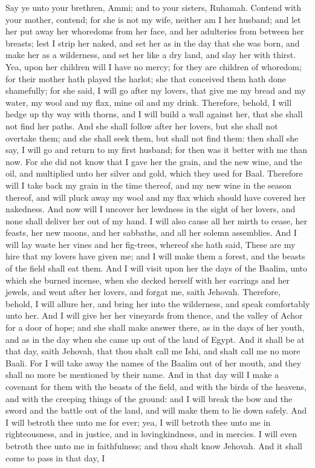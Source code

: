 Say ye unto your brethren, Ammi; and to your sisters, Ruhamah.  Contend with your mother, contend; for she is not my wife, neither am I her husband; and let her put away her whoredoms from her face, and her adulteries from between her breasts; lest I strip her naked, and set her as in the day that she was born, and make her as a wilderness, and set her like a dry land, and slay her with thirst. Yea, upon her children will I have no mercy; for they are children of whoredom; for their mother hath played the harlot; she that conceived them hath done shamefully; for she said, I will go after my lovers, that give me my bread and my water, my wool and my flax, mine oil and my drink. Therefore, behold, I will hedge up thy way with thorns, and I will build a wall against her, that she shall not find her paths. And she shall follow after her lovers, but she shall not overtake them; and she shall seek them, but shall not find them: then shall she say, I will go and return to my first husband; for then was it better with me than now.  For she did not know that I gave her the grain, and the new wine, and the oil, and multiplied unto her silver and gold, which they used for Baal. Therefore will I take back my grain in the time thereof, and my new wine in the season thereof, and will pluck away my wool and my flax which should have covered her nakedness. And now will I uncover her lewdness in the sight of her lovers, and none shall deliver her out of my hand. I will also cause all her mirth to cease, her feasts, her new moons, and her sabbaths, and all her solemn assemblies. And I will lay waste her vines and her fig-trees, whereof she hath said, These are my hire that my lovers have given me; and I will make them a forest, and the beasts of the field shall eat them. And I will visit upon her the days of the Baalim, unto which she burned incense, when she decked herself with her earrings and her jewels, and went after her lovers, and forgat me, saith Jehovah.  Therefore, behold, I will allure her, and bring her into the wilderness, and speak comfortably unto her. And I will give her her vineyards from thence, and the valley of Achor for a door of hope; and she shall make answer there, as in the days of her youth, and as in the day when she came up out of the land of Egypt. And it shall be at that day, saith Jehovah, that thou shalt call me Ishi, and shalt call me no more Baali. For I will take away the names of the Baalim out of her mouth, and they shall no more be mentioned by their name. And in that day will I make a covenant for them with the beasts of the field, and with the birds of the heavens, and with the creeping things of the ground: and I will break the bow and the sword and the battle out of the land, and will make them to lie down safely. And I will betroth thee unto me for ever; yea, I will betroth thee unto me in righteousness, and in justice, and in lovingkindness, and in mercies. I will even betroth thee unto me in faithfulness; and thou shalt know Jehovah.  And it shall come to pass in that day, I 